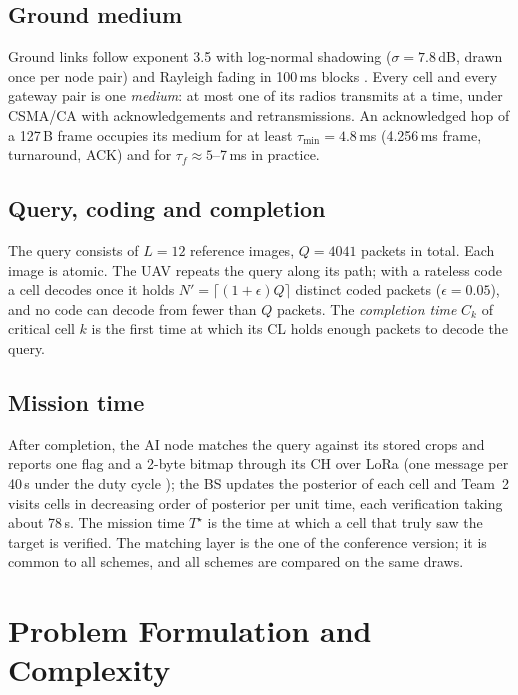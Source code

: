 \subsection{Ground medium}
Ground links follow exponent 3.5 with log-normal shadowing ($\sigma=7.8$\,dB, drawn once per node pair) and Rayleigh
fading in 100\,ms blocks \cite{tr38901}. Every cell and every gateway pair is one \emph{medium}: at most one of its
radios transmits at a time, under CSMA/CA with acknowledgements and retransmissions. An acknowledged hop of a 127\,B frame
occupies its medium for at least $\tau_{\min}=4.8$\,ms (4.256\,ms frame, turnaround, ACK) and for $\tau_f\approx5$--7\,ms
in practice.

\subsection{Query, coding and completion}
The query consists of $L=12$ reference images, $Q=4041$ packets in total. Each image is atomic. The UAV repeats the
query along its path; with a rateless code a cell decodes once it holds $N'=\lceil(1+\epsilon)Q\rceil$ distinct coded
packets ($\epsilon=0.05$), and no code can decode from fewer than $Q$ packets. The \emph{completion time} $C_k$ of
critical cell $k$ is the first time at which its CL holds enough packets to decode the query.

\subsection{Mission time}
After completion, the AI node matches the query against its stored crops and reports one flag and a 2-byte bitmap
through its CH over LoRa (one message per 40\,s under the duty cycle \cite{etsi220}); the BS updates the posterior of each
cell and Team~2 visits cells in decreasing order of posterior per unit time, each verification taking about 78\,s. The
mission time $T^\star$ is the time at which a cell that truly saw the target is verified. The matching layer is the one
of the conference version; it is common to all schemes, and all schemes are compared on the same draws.

\section{Problem Formulation and Complexity}\label{sec:problem}

